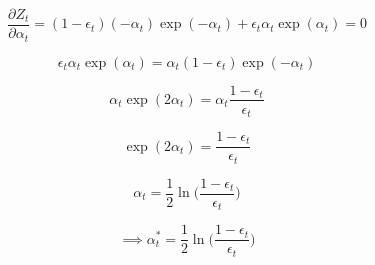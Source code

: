 \documentclass[12 pt]{article}
\begin{document}
	\[ \frac{\partial Z_t}{\partial \alpha_t} = (1 - \epsilon_t)(-\alpha_t)\exp(-\alpha_t)
	+ \epsilon_t \alpha_t \exp(\alpha_t) = 0 \]
	
	\[ \epsilon_t \alpha_t \exp(\alpha_t) = \alpha_t (1 - \epsilon_t) \exp(-\alpha_t) \]
	
	\[ \alpha_t \exp(2 \alpha_t) =\alpha_t \frac{1 - \epsilon_t}{\epsilon_t} \]
	
	\[ \exp(2 \alpha_t) = \frac{1 - \epsilon_t}{\epsilon_t} \]
	
	\[ \alpha_t = \frac{1}{2} \ln \Big(\frac{1 - \epsilon_t}{\epsilon_t} \Big) \]
	
	\[ \implies \alpha^*_t = \frac{1}{2} \ln \Big(\frac{1 - \epsilon_t}{\epsilon_t} \Big) \]
	
	
	
\end{document}

